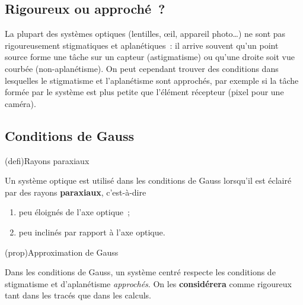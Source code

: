 \documentclass[../../main/main.tex]{subfiles}
\begin{document}
\subsection{Rigoureux ou approché~?}

La plupart des systèmes optiques (lentilles, œil, appareil photo…) ne sont pas
rigoureusement stigmatiques et aplanétiques~: il arrive souvent qu'un point
source forme une tâche sur un capteur (astigmatisme) ou qu'une droite soit vue
courbée (non-aplanétisme). On peut cependant trouver des conditions
dans lesquelles le stigmatisme et l'aplanétisme sont approchés, par exemple si
la tâche formée par le système est plus petite que l'élément récepteur (pixel
pour une caméra).

\subsection{Conditions de Gauss}

\begin{tcbraster}[raster columns=2, raster equal height=rows]

	\begin{tcb}[label=def:gausscond](defi){Rayons paraxiaux}

		Un système optique est utilisé dans les conditions de Gauss lorsqu'il
		est éclairé par des rayons \textbf{paraxiaux}, c'est-à-dire

		\begin{enumerate}
			\item peu éloignés de l'axe optique~;
			\item peu inclinés par rapport à l'axe optique.
		\end{enumerate}
	\end{tcb}
	\begin{tcb}[label=prop:gaussprop](prop){Approximation de Gauss}

		Dans les conditions de Gauss, un système centré respecte les conditions
		de stigmatisme et d'aplanétisme \textit{approchés}. On les
		\textbf{considérera} comme rigoureux tant dans les tracés que dans les
		calculs.

	\end{tcb}
\end{tcbraster}

\end{document}
